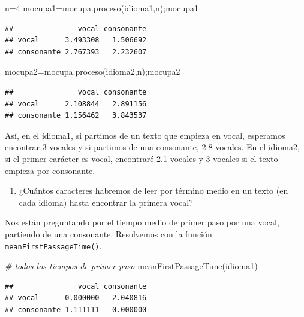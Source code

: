 \documentclass[
]{book}
\newenvironment{Shaded}{\begin{snugshade}}{\end{snugshade}}
\newcommand{\CommentTok}[1]{\textcolor[rgb]{0.56,0.35,0.01}{\textit{#1}}}
\newcommand{\DecValTok}[1]{\textcolor[rgb]{0.00,0.00,0.81}{#1}}
\newcommand{\FunctionTok}[1]{\textcolor[rgb]{0.00,0.00,0.00}{#1}}
\newcommand{\NormalTok}[1]{#1}
\newcommand{\OtherTok}[1]{\textcolor[rgb]{0.56,0.35,0.01}{#1}}
\providecommand{\tightlist}{%
  \setlength{\itemsep}{0pt}\setlength{\parskip}{0pt}}
\theoremstyle{definition}
\theoremstyle{definition}
\theoremstyle{definition}
\theoremstyle{definition}
\theoremstyle{remark}
\begin{document}
\begin{Shaded}
\begin{Highlighting}[]
\NormalTok{n}\OtherTok{=}\DecValTok{4}
\NormalTok{mocupa1}\OtherTok{=}\FunctionTok{mocupa.proceso}\NormalTok{(idioma1,n);mocupa1}
\end{Highlighting}
\end{Shaded}

\begin{verbatim}
##               vocal consonante
## vocal      3.493308   1.506692
## consonante 2.767393   2.232607
\end{verbatim}

\begin{Shaded}
\begin{Highlighting}[]
\NormalTok{mocupa2}\OtherTok{=}\FunctionTok{mocupa.proceso}\NormalTok{(idioma2,n);mocupa2}
\end{Highlighting}
\end{Shaded}

\begin{verbatim}
##               vocal consonante
## vocal      2.108844   2.891156
## consonante 1.156462   3.843537
\end{verbatim}

Así, en el idioma1, si partimos de un texto que empieza en vocal, esperamos encontrar 3 vocales y si partimos de una consonante, 2.8 vocales. En el idioma2, si el primer carácter es vocal, encontraré 2.1 vocales y 3 vocales si el texto empieza por consonante.

\begin{enumerate}
\def\labelenumi{\arabic{enumi}.}
\setcounter{enumi}{3}
\tightlist
\item
  ¿Cuántos caracteres habremos de leer por término medio en un texto (en cada idioma) hasta encontrar la primera vocal?
\end{enumerate}

Nos están preguntando por el tiempo medio de primer paso por una vocal, partiendo de una consonante. Resolvemos con la función \texttt{meanFirstPassageTime()}.

\begin{Shaded}
\begin{Highlighting}[]
\CommentTok{\# todos los tiempos de primer paso}
\FunctionTok{meanFirstPassageTime}\NormalTok{(idioma1)}
\end{Highlighting}
\end{Shaded}

\begin{verbatim}
##               vocal consonante
## vocal      0.000000   2.040816
## consonante 1.111111   0.000000
\end{verbatim}
\end{document}
